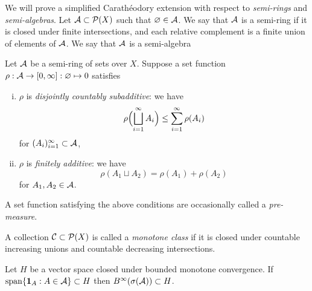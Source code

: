 \documentclass{../../large}
\begin{document}
\begin{prb}
We will prove a simplified Carath\'eodory extension with respect to \emph{semi-rings} and \emph{semi-algebras}.
Let $\mathcal{A}\subset\mathcal{P}(X)$ such that $\varnothing\in\mathcal{A}$.
We say that $\mathcal{A}$ is a semi-ring if it is closed under finite intersections, and each relative complement is a finite union of elements of $\mathcal{A}$.
We say that $\mathcal{A}$ is a semi-algebra

Let $\mathcal{A}$ be a semi-ring of sets over $X$.
Suppose a set function $\rho:\mathcal{A}\to[0,\infty]:\varnothing\mapsto0$ satisfies
\begin{enumerate}[(i)]
\item $\rho$ is \emph{disjointly countably subadditive}: we have
\[\rho\Bigl(\bigsqcup_{i=1}^\infty A_i\Bigr)\le\sum_{i=1}^\infty\rho(A_i)\]
for $(A_i)_{i=1}^\infty\subset\mathcal{A}$,
\item $\rho$ is \emph{finitely additive}: we have
\[\rho(A_1\sqcup A_2)=\rho(A_1)+\rho(A_2)\]
for $A_1,A_2\in\mathcal{A}$.
\end{enumerate}
A set function satisfying the above conditions are occasionally called a \emph{pre-measure}.
\begin{parts}
\item
\item 
\end{parts}
\end{prb}

\begin{prb}
A collection $\mathcal{C}\subset\mathcal{P}(X)$ is called a \emph{monotone class} if it is closed under countable increasing unions and countable decreasing intersections.

Let $H$ be a vector space closed under bounded monotone convergence.
If $\operatorname{span}\{\mathbf{1}_A:A\in\mathcal{A}\}\subset H$ then $B^\infty(\sigma(\mathcal{A}))\subset H$.
\end{prb}
\end{document}
